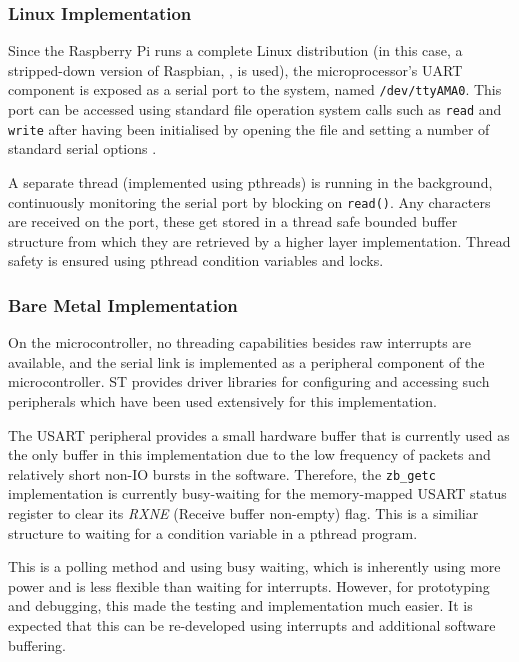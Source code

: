 \subsubsection{Linux Implementation}
Since the Raspberry Pi runs a complete Linux distribution (in this case, a stripped-down version of Raspbian, \cite{raspbian}, is used), the microprocessor's UART component is exposed as a serial port to the system, named \texttt{/dev/ttyAMA0}. This port can be accessed using standard file operation system calls such as \texttt{read} and \texttt{write} after having been initialised by opening the file and setting a number of standard serial options \cite{posix-serial-programming}.

A separate thread (implemented using pthreads) is running in the background, continuously monitoring the serial port by blocking on \texttt{read()}. Any characters are received on the port, these get stored in a thread safe bounded buffer structure from which they are retrieved by a higher layer implementation. Thread safety is ensured using pthread condition variables and locks.

\subsubsection{Bare Metal Implementation}
On the microcontroller, no threading capabilities besides raw interrupts are available, and the serial link is implemented as a peripheral component of the microcontroller. ST provides driver libraries for configuring and accessing such peripherals which have been used extensively for this implementation.

The USART peripheral provides a small hardware buffer that is currently used as the only buffer in this implementation due to the low frequency of packets and relatively short non-IO bursts in the software. Therefore, the \texttt{zb\_getc} implementation is currently busy-waiting for the memory-mapped USART status register to clear its \emph{RXNE} (Receive buffer non-empty) flag. This is a similiar structure to waiting for a condition variable in a pthread program. %

This is a polling method and using busy waiting, which is inherently using more power and is less flexible than waiting for interrupts. However, for prototyping and debugging, this made the testing and implementation much easier. It is expected that this can be re-developed using interrupts and additional software buffering. 

